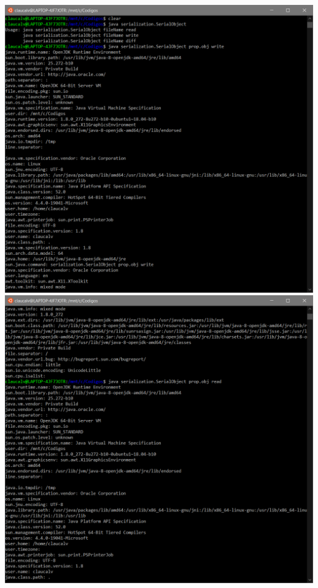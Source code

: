 \vspace{2em}
\begin{minipage}{\textwidth}
    \hspace{-1em}
    \centering
    \includegraphics[scale=.35]{prints/serial1.PNG}
    \hspace{1em}
    \includegraphics[scale=.35]{prints/serial2.PNG}

\end{minipage}
